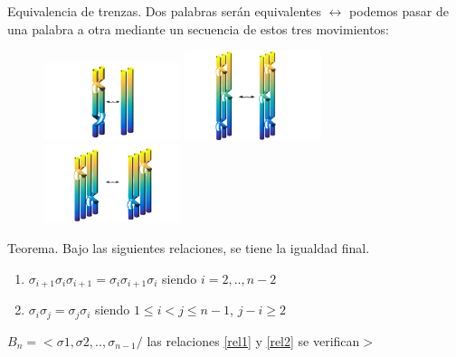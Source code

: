 \documentclass{beamer}
\begin{document}
\begin{frame}{Equivalencia de trenzas. }
	Dos palabras serán equivalentes $ \leftrightarrow $ podemos pasar de una palabra a otra mediante un secuencia de estos tres movimientos:		\begin{figure}[h!]
		\includegraphics[width=4cm]{imagenes/M1.png}
		\includegraphics[width=4cm]{imagenes/M2.png}
		\includegraphics[width=4cm]{imagenes/M3.png}
	\end{figure}
	\begin{alertblock}{Teorema.}
			Bajo las siguientes relaciones, se tiene la igualdad final.
			\begin{enumerate}
				\item $ \sigma_{i+1}\sigma_{i}\sigma_{i+1} =\sigma_{i}\sigma_{i+1}\sigma_{i} $ siendo $i=2,..,n-2 $ \label{rel1}
				\item $ \sigma_{i}\sigma_{j}=\sigma_{j}\sigma_{i} $ siendo $1 \le i < j \le n-1 $, $j-i \geq 2$	 \label{rel2}   	
			\end{enumerate}
			\begin{center}
				$B_{n} = <\sigma1, \sigma2,..,\sigma_{n-1} /$ las relaciones \ref{rel1} y \ref{rel2} se verifican$>$
			\end{center}
	\end{alertblock}

\end{frame}
\end{document}
